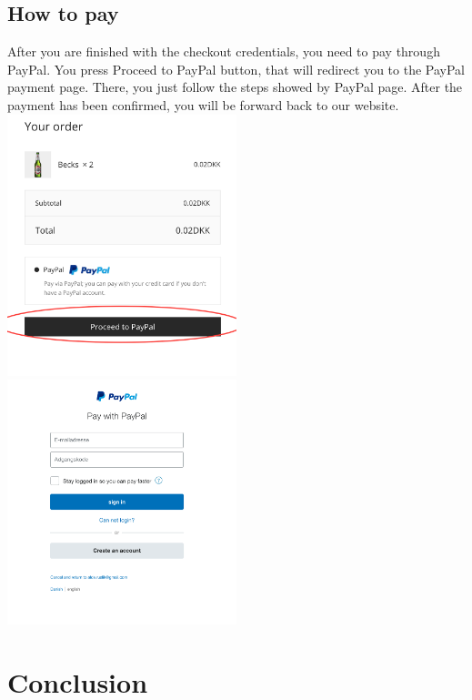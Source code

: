 \documentclass[12p]{article}
\begin{document}
\subsection{How to pay}
After you are finished with the checkout credentials, you need to pay through PayPal. You press Proceed to PayPal button, that will redirect you to the PayPal payment page. There, you just follow the steps showed by PayPal page. After the payment has been confirmed, you will be forward back to our website.
\\
\includegraphics[width=0.5\textwidth]{11.png}
\includegraphics[width=0.5\textwidth]{12.png}


\newpage
\section{Conclusion}

\end{document}
